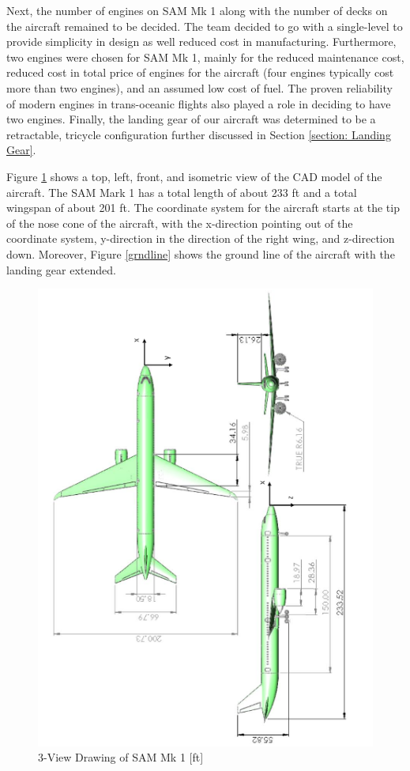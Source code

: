 Next, the number of engines on SAM Mk 1 along with the number of decks on the aircraft remained to be decided. The team decided to go with a single-level to provide simplicity in design as well reduced cost in manufacturing. Furthermore, two engines were chosen for SAM Mk 1, mainly for the reduced maintenance cost, reduced cost in total price of engines for the aircraft (four engines typically cost more than two engines), and an assumed low cost of fuel. The proven reliability of modern engines in trans-oceanic flights also played a role in deciding to have two engines. Finally, the landing gear of our aircraft was determined to be a retractable, tricycle configuration further discussed in Section \ref{section: Landing Gear}. 

\clearpage
Figure \ref{fig:threeview} shows a top, left, front, and isometric view of the CAD model of the aircraft. The SAM Mark 1 has a total length of about 233 ft and a total wingspan of about 201 ft. The coordinate system for the aircraft starts at the tip of the nose cone of the aircraft, with the x-direction pointing out of the coordinate system, y-direction in the direction of the right wing, and z-direction down. Moreover, Figure \ref{grndline} shows the ground line of the aircraft with the landing gear extended.

\begin{figure}[H]
    \centering
    \includegraphics[width=.815\linewidth]{Photos/3 view Jack.png}
    \caption{3-View Drawing of SAM Mk 1 [ft]}
    \label{fig:threeview}
\end{figure}
\clearpage

